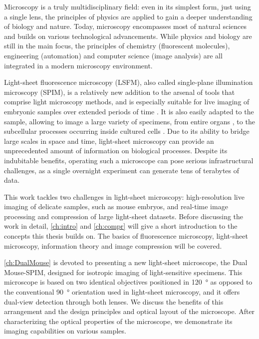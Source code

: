 Microscopy is a truly multidisciplinary field: even in its simplest form, just using a single lens, the principles of physics are applied to gain a deeper understanding of biology and nature. Today, microscopy encompasses most of natural sciences and builds on various technological advancements. While physics and biology are still in the main focus, the principles of chemistry (fluorescent molecules), engineering (automation) and computer science (image analysis) are all integrated in a modern microscopy environment.

Light-sheet fluorescence microscopy (LSFM), also called single-plane illumination microscopy (SPIM), is a relatively new addition to the arsenal of tools that comprise light microscopy methods, and is especially suitable for live imaging of embryonic samples over extended periods of time \cite{keller_quantitative_2008, huisken_selective_2009, weber_light_2011,tomer_shedding_2011}. It is also easily adapted to the sample, allowing to image a large variety of specimens, from entire organs \cite{dodt_ultramicroscopy:_2007}, to the subcellular processes occurring inside cultured cells \cite{chen_lattice_2014}. Due to its ability to bridge large scales in space and time, light-sheet microscopy can provide an unprecedented amount of information on biological processes. Despite its indubitable benefits, operating such a microscope can pose serious infrastructural challenges, as a single overnight experiment can generate tens of terabytes of data.

This work tackles two challenges in light-sheet microscopy: high-resolution live imaging of delicate samples, such as mouse embryos, and real-time image processing and compression of large light-sheet datasets. Before discussing the work in detail, \autoref{ch:intro} and \autoref{ch:compr} will give a short introduction to the concepts this thesis builds on. The basics of fluorescence microscopy, light-sheet microscopy, information theory and image compression will be covered.

\autoref{ch:DualMouse} is devoted to presenting a new light-sheet microscope, the Dual Mouse-SPIM, designed for isotropic imaging of light-sensitive specimens. This microscope is based on two identical objectives positioned in \SI{120}{\degree} as opposed to the conventional \SI{90}{\degree} orientation used in light-sheet microscopy, and it offers dual-view detection through both lenses. We discuss the benefits of this arrangement and the design principles and optical layout of the microscope. After characterizing the optical properties of the microscope, we demonstrate its imaging capabilities on various samples.

